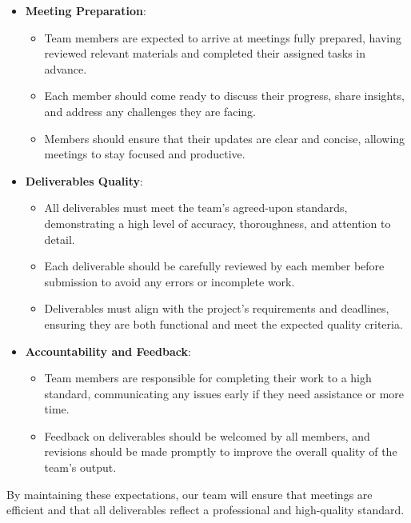 \documentclass{article}
\begin{document}
\begin{itemize}
  \item \textbf{Meeting Preparation}:
    \begin{itemize}
      \item Team members are expected to arrive at meetings fully
        prepared, having reviewed relevant materials and completed
        their assigned tasks in advance.
      \item Each member should come ready to discuss their progress,
        share insights, and address any challenges they are facing.
      \item Members should ensure that their updates are clear and
        concise, allowing meetings to stay focused and productive.
    \end{itemize}

  \item \textbf{Deliverables Quality}:
    \begin{itemize}
      \item All deliverables must meet the team’s agreed-upon
        standards, demonstrating a high level of accuracy,
        thoroughness, and attention to detail.
      \item Each deliverable should be carefully reviewed by each
        member before submission to avoid any errors or incomplete work.
      \item Deliverables must align with the project's requirements
        and deadlines, ensuring they are both functional and meet the
        expected quality criteria.
    \end{itemize}

  \item \textbf{Accountability and Feedback}:
    \begin{itemize}
      \item Team members are responsible for completing their work to
        a high standard, communicating any issues early if they need
        assistance or more time.
      \item Feedback on deliverables should be welcomed by all
        members, and revisions should be made promptly to improve the
        overall quality of the team’s output.
    \end{itemize}

\end{itemize}

\noindent
By maintaining these expectations, our team will ensure that meetings
are efficient and that all deliverables reflect a professional and
high-quality standard.
\end{document}
